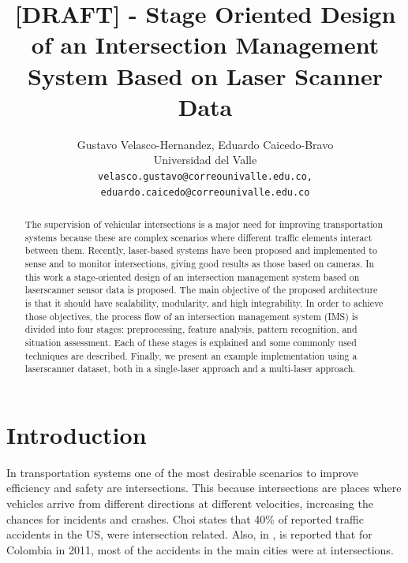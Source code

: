 \documentclass[10pt,twocolumn,letterpaper]{article}
\begin{document}
\title{[DRAFT] - Stage Oriented Design of an Intersection Management System Based on Laser Scanner Data}

\author{Gustavo Velasco-Hernandez, Eduardo Caicedo-Bravo \\
Universidad del Valle\\
{\tt\small velasco.gustavo@correounivalle.edu.co, eduardo.caicedo@correounivalle.edu.co}
}

\maketitle

\begin{abstract}
The supervision of vehicular intersections is a major need for improving transportation systems because these are complex scenarios where different traffic elements interact between them. Recently, laser-based systems have been proposed and implemented to sense and to monitor intersections, giving good results as those based on cameras. In this work a stage-oriented design of an intersection management system based on laserscanner sensor data is proposed. The main objective of the proposed architecture is that it should have scalability, modularity, and high integrability. In order to achieve those objectives, the process flow of an intersection management system (IMS) is divided into four stages: preprocessing, feature analysis, pattern recognition, and situation assessment. Each of these stages is explained and some commonly used techniques are described. Finally, we present an example implementation using a laserscanner dataset, both in a single-laser approach and a multi-laser approach.

\end{abstract}


\section{Introduction}

In transportation systems one of the most desirable scenarios to improve efficiency and safety are intersections. This because intersections are places where vehicles arrive from different directions at different velocities, increasing the chances for incidents and crashes. Choi \cite{Choi2010} states that 40\% of reported traffic accidents in the US, were intersection related. Also, in  \cite{CorporacionFondodePrevencionVial2010}, is reported that for Colombia in 2011, most of the accidents in the main cities were at intersections.
\end{document}
